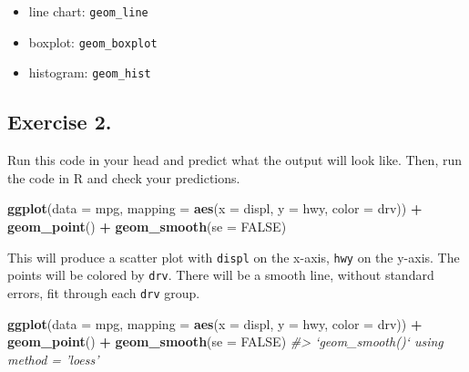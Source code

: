 \documentclass[]{book}
\newenvironment{Shaded}{\begin{snugshade}}{\end{snugshade}}
\newcommand{\CommentTok}[1]{\textcolor[rgb]{0.56,0.35,0.01}{\textit{#1}}}
\newcommand{\DataTypeTok}[1]{\textcolor[rgb]{0.13,0.29,0.53}{#1}}
\newcommand{\KeywordTok}[1]{\textcolor[rgb]{0.13,0.29,0.53}{\textbf{#1}}}
\newcommand{\NormalTok}[1]{#1}
\newcommand{\OperatorTok}[1]{\textcolor[rgb]{0.81,0.36,0.00}{\textbf{#1}}}
\newcommand{\OtherTok}[1]{\textcolor[rgb]{0.56,0.35,0.01}{#1}}
\newcommand{\StringTok}[1]{\textcolor[rgb]{0.31,0.60,0.02}{#1}}
\providecommand{\tightlist}{%
  \setlength{\itemsep}{0pt}\setlength{\parskip}{0pt}}
\theoremstyle{definition}
\theoremstyle{definition}
\theoremstyle{definition}
\theoremstyle{remark}
\begin{document}
\begin{itemize}
\tightlist
\item
  line chart: \texttt{geom\_line}
\item
  boxplot: \texttt{geom\_boxplot}
\item
  histogram: \texttt{geom\_hist}
\end{itemize}

\hypertarget{exercise-2.-3}{%
\subsection{Exercise 2.}\label{exercise-2.-3}}

Run this code in your head and predict what the output will look like.
Then, run the code in R and check your predictions.

\begin{Shaded}
\begin{Highlighting}[]
\KeywordTok{ggplot}\NormalTok{(}\DataTypeTok{data =}\NormalTok{ mpg, }\DataTypeTok{mapping =} \KeywordTok{aes}\NormalTok{(}\DataTypeTok{x =}\NormalTok{ displ, }\DataTypeTok{y =}\NormalTok{ hwy, }\DataTypeTok{color =}\NormalTok{ drv)) }\OperatorTok{+}\StringTok{ }
\StringTok{  }\KeywordTok{geom_point}\NormalTok{() }\OperatorTok{+}\StringTok{ }
\StringTok{  }\KeywordTok{geom_smooth}\NormalTok{(}\DataTypeTok{se =} \OtherTok{FALSE}\NormalTok{)}
\end{Highlighting}
\end{Shaded}

This will produce a scatter plot with \texttt{displ} on the x-axis,
\texttt{hwy} on the y-axis. The points will be colored by \texttt{drv}.
There will be a smooth line, without standard errors, fit through each
\texttt{drv} group.

\begin{Shaded}
\begin{Highlighting}[]
\KeywordTok{ggplot}\NormalTok{(}\DataTypeTok{data =}\NormalTok{ mpg, }\DataTypeTok{mapping =} \KeywordTok{aes}\NormalTok{(}\DataTypeTok{x =}\NormalTok{ displ, }\DataTypeTok{y =}\NormalTok{ hwy, }\DataTypeTok{color =}\NormalTok{ drv)) }\OperatorTok{+}\StringTok{ }
\StringTok{  }\KeywordTok{geom_point}\NormalTok{() }\OperatorTok{+}\StringTok{ }
\StringTok{  }\KeywordTok{geom_smooth}\NormalTok{(}\DataTypeTok{se =} \OtherTok{FALSE}\NormalTok{)}
\CommentTok{#> `geom_smooth()` using method = 'loess'}
\end{Highlighting}
\end{Shaded}
\end{document}
